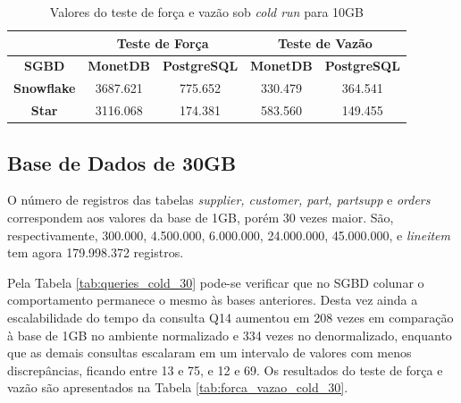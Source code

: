 \begin{table}[htpb]
        \centering
        \caption{Valores do teste de força e vazão sob \textit{cold run} para 10GB}
        \label{tab:forca_vazao_cold_10}
        \begin{tabular}{|c|c|c|c|c|}
        \hline
                                & \multicolumn{2}{c|}{\textbf{Teste de Força}} & \multicolumn{2}{c|}{\textbf{Teste de Vazão}} \\ \hline
        \textbf{SGBD}      & \textbf{MonetDB}    & \textbf{PostgreSQL}    & \textbf{MonetDB}    & \textbf{PostgreSQL}    \\ \hline
        \textbf{Snowflake} & 3687.621            & 775.652                & 330.479             & 364.541                \\ \hline
        \textbf{Star}      & 3116.068            & 174.381                & 583.560             & 149.455                \\ \hline
        \end{tabular}
\end{table}


\subsection{Base de Dados de 30GB}

O número de registros das tabelas \textit{supplier, customer, part, partsupp} e \textit{orders} correspondem aos valores da base de 1GB, porém 30 vezes maior. São, respectivamente, 300.000, 4.500.000, 6.000.000, 24.000.000, 45.000.000, e \textit{lineitem} tem agora 179.998.372 registros.

Pela Tabela \ref{tab:queries_cold_30} pode-se verificar que no SGBD colunar o comportamento permanece o mesmo às bases anteriores. Desta vez ainda a escalabilidade do tempo da consulta Q14 aumentou em 208 vezes em comparação à base de 1GB no ambiente normalizado e 334 vezes no denormalizado, enquanto que as demais consultas escalaram em um intervalo de valores com menos discrepâncias, ficando entre 13 e 75, e 12 e 69. Os resultados do teste de força e vazão são apresentados na Tabela \ref{tab:forca_vazao_cold_30}.


